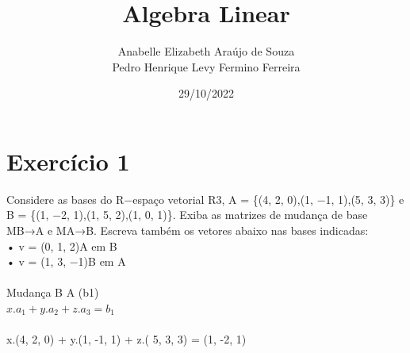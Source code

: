 \documentclass{article}
\title{Algebra Linear}
\date{29/10/2022}
\author{Anabelle Elizabeth Araújo de Souza\\Pedro Henrique Levy Fermino Ferreira\\}
\begin{document}
\maketitle

\section{Exercício 1}\label{ex1}
Considere as bases do R−espaço vetorial R3, A = \{(4, 2, 0),(1, −1, 1),(5, 3, 3)\}  e
B = \{(1, −2, 1),(1, 5, 2),(1, 0, 1)\}. Exiba as matrizes de mudança de base MB→A e MA→B. Escreva também os
vetores abaixo nas bases indicadas:
\\• v = (0, 1, 2)A em B
\\• v = (1, 3, −1)B em A\\
\textbf\\{Mudança B \rightarrow A (b1)
\\$x. a_1 + y. a_2 + z. a_3 = b_1 $\\\\}
x.(4, 2, 0) + y.(1, -1, 1) + z.( 5, 3, 3) = (1, -2, 1) \\\\
\end{document}
